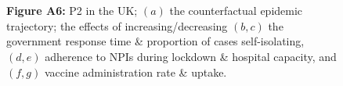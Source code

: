 \documentclass[paper=a4,fontsize=11pt]{article}
\begin{document}
\begin{figure}[!h]
  \\
  \hspace{1.76cm}
  \\
  \caption*{\textbf{Figure A6:} P2 in the UK; $(a)$ the counterfactual epidemic trajectory; the effects of increasing/decreasing $(b,c)$ the government response time \& proportion of cases self-isolating, $(d,e)$ adherence to NPIs during lockdown \& hospital capacity, and $(f,g)$ vaccine administration rate \& uptake.}
\end{figure}
\end{document}
